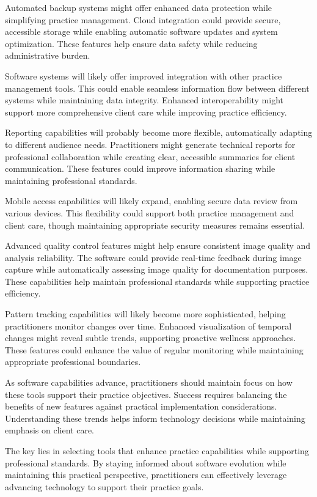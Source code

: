 \documentclass[
  Letterpaper,
]{scrbook}
\begin{document}
Automated backup systems might offer enhanced data protection while
simplifying practice management. Cloud integration could provide secure,
accessible storage while enabling automatic software updates and system
optimization. These features help ensure data safety while reducing
administrative burden.

Software systems will likely offer improved integration with other
practice management tools. This could enable seamless information flow
between different systems while maintaining data integrity. Enhanced
interoperability might support more comprehensive client care while
improving practice efficiency.

Reporting capabilities will probably become more flexible, automatically
adapting to different audience needs. Practitioners might generate
technical reports for professional collaboration while creating clear,
accessible summaries for client communication. These features could
improve information sharing while maintaining professional standards.

Mobile access capabilities will likely expand, enabling secure data
review from various devices. This flexibility could support both
practice management and client care, though maintaining appropriate
security measures remains essential.

Advanced quality control features might help ensure consistent image
quality and analysis reliability. The software could provide real-time
feedback during image capture while automatically assessing image
quality for documentation purposes. These capabilities help maintain
professional standards while supporting practice efficiency.

Pattern tracking capabilities will likely become more sophisticated,
helping practitioners monitor changes over time. Enhanced visualization
of temporal changes might reveal subtle trends, supporting proactive
wellness approaches. These features could enhance the value of regular
monitoring while maintaining appropriate professional boundaries.

As software capabilities advance, practitioners should maintain focus on
how these tools support their practice objectives. Success requires
balancing the benefits of new features against practical implementation
considerations. Understanding these trends helps inform technology
decisions while maintaining emphasis on client care.

The key lies in selecting tools that enhance practice capabilities while
supporting professional standards. By staying informed about software
evolution while maintaining this practical perspective, practitioners
can effectively leverage advancing technology to support their practice
goals.
\end{document}
